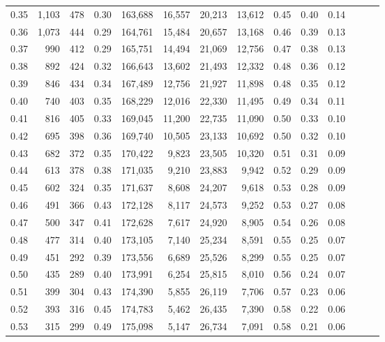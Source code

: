 \begin{tabular}{rrrrrrrrrrrrrr}
0.35 &   1,103 &  478 &  0.30 &  163,688 &   16,557 &  20,213 &  13,612 &  0.45 &  0.40 &      0.14 \\
0.36 &   1,073 &  444 &  0.29 &  164,761 &   15,484 &  20,657 &  13,168 &  0.46 &  0.39 &      0.13 \\
0.37 &     990 &  412 &  0.29 &  165,751 &   14,494 &  21,069 &  12,756 &  0.47 &  0.38 &      0.13 \\
0.38 &     892 &  424 &  0.32 &  166,643 &   13,602 &  21,493 &  12,332 &  0.48 &  0.36 &      0.12 \\
0.39 &     846 &  434 &  0.34 &  167,489 &   12,756 &  21,927 &  11,898 &  0.48 &  0.35 &      0.12 \\
0.40 &     740 &  403 &  0.35 &  168,229 &   12,016 &  22,330 &  11,495 &  0.49 &  0.34 &      0.11 \\
0.41 &     816 &  405 &  0.33 &  169,045 &   11,200 &  22,735 &  11,090 &  0.50 &  0.33 &      0.10 \\
0.42 &     695 &  398 &  0.36 &  169,740 &   10,505 &  23,133 &  10,692 &  0.50 &  0.32 &      0.10 \\
0.43 &     682 &  372 &  0.35 &  170,422 &    9,823 &  23,505 &  10,320 &  0.51 &  0.31 &      0.09 \\
0.44 &     613 &  378 &  0.38 &  171,035 &    9,210 &  23,883 &   9,942 &  0.52 &  0.29 &      0.09 \\
0.45 &     602 &  324 &  0.35 &  171,637 &    8,608 &  24,207 &   9,618 &  0.53 &  0.28 &      0.09 \\
0.46 &     491 &  366 &  0.43 &  172,128 &    8,117 &  24,573 &   9,252 &  0.53 &  0.27 &      0.08 \\
0.47 &     500 &  347 &  0.41 &  172,628 &    7,617 &  24,920 &   8,905 &  0.54 &  0.26 &      0.08 \\
0.48 &     477 &  314 &  0.40 &  173,105 &    7,140 &  25,234 &   8,591 &  0.55 &  0.25 &      0.07 \\
0.49 &     451 &  292 &  0.39 &  173,556 &    6,689 &  25,526 &   8,299 &  0.55 &  0.25 &      0.07 \\
0.50 &     435 &  289 &  0.40 &  173,991 &    6,254 &  25,815 &   8,010 &  0.56 &  0.24 &      0.07 \\
0.51 &     399 &  304 &  0.43 &  174,390 &    5,855 &  26,119 &   7,706 &  0.57 &  0.23 &      0.06 \\
0.52 &     393 &  316 &  0.45 &  174,783 &    5,462 &  26,435 &   7,390 &  0.58 &  0.22 &      0.06 \\
0.53 &     315 &  299 &  0.49 &  175,098 &    5,147 &  26,734 &   7,091 &  0.58 &  0.21 &      0.06 \\

\end{tabular}
